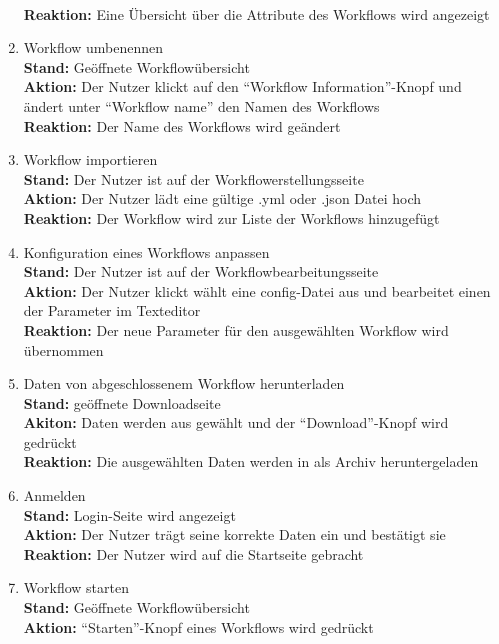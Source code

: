 \begin{enumerate}
    \\ \textbf{Reaktion:} Eine Übersicht über die Attribute des Workflows wird angezeigt
    \item Workflow umbenennen
    \\ \textbf{Stand:} Geöffnete Workflowübersicht
    \\ \textbf{Aktion:} Der \gls{Nutzer} klickt auf den \enquote{Workflow Information}-Knopf und ändert unter \enquote{Workflow name} den Namen des Workflows
    \\ \textbf{Reaktion:} Der Name des Workflows wird geändert
    \item Workflow importieren
    \\ \textbf{Stand:} Der \gls{Nutzer} ist auf der Workflowerstellungsseite 
    \\ \textbf{Aktion:} Der \gls{Nutzer} lädt eine gültige .yml oder .json Datei hoch 
    \\ \textbf{Reaktion:} Der Workflow wird zur Liste der Workflows hinzugefügt
    \item Konfiguration eines Workflows anpassen
    \\ \textbf{Stand:} Der \gls{Nutzer} ist auf der Workflowbearbeitungsseite
    \\ \textbf{Aktion:} Der \gls{Nutzer} klickt wählt eine config-Datei aus und bearbeitet einen der Parameter im Texteditor
    \\ \textbf{Reaktion:} Der neue Parameter für den ausgewählten Workflow wird übernommen
    \item Daten von abgeschlossenem Workflow herunterladen
    \\ \textbf{Stand:} geöffnete Downloadseite
    \\ \textbf{Akiton:} Daten werden aus gewählt und der \enquote{Download}-Knopf wird gedrückt
    \\ \textbf{Reaktion:} Die ausgewählten Daten werden in als Archiv heruntergeladen
    \item Anmelden
    \\ \textbf{Stand:} Login-Seite wird angezeigt
    \\ \textbf{Aktion:} Der \gls{Nutzer} trägt seine korrekte Daten ein und bestätigt sie
    \\ \textbf{Reaktion:} Der \gls{Nutzer} wird auf die Startseite gebracht
    \item Workflow starten
    \\ \textbf{Stand:} Geöffnete Workflowübersicht 
    \\ \textbf{Aktion:} \enquote{Starten}-Knopf eines Workflows wird gedrückt

\end{enumerate}
